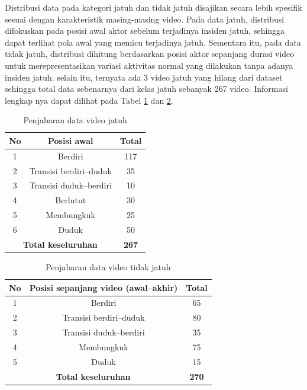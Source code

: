 Distribusi data pada kategori jatuh dan tidak jatuh disajikan secara lebih spesifik sesuai dengan karakteristik masing-masing video. Pada data jatuh, distribusi difokuskan pada posisi awal aktor sebelum terjadinya insiden jatuh, sehingga dapat terlihat pola awal yang memicu terjadinya jatuh. Sementara itu, pada data tidak jatuh, distribusi dihitung berdasarkan posisi aktor sepanjang durasi video untuk merepresentasikan variasi aktivitas normal yang dilakukan tanpa adanya insiden jatuh. selain itu, ternyata ada 3 video jatuh yang hilang dari dataset sehingga total data sebenarnya dari kelas jatuh sebanyak 267 video. Informasi lengkap nya dapat dilihat pada Tabel \ref{table:4.data jatuh} dan \ref{table:4.data tidak jatuh}. \par


\begin{table}[htbp]
    \centering
    \caption{Penjabaran data video jatuh}
    \label{table:4.data jatuh}
    \begin{tabular}{|c|c|c|}
        \hline
        \textbf{No} & \textbf{Posisi awal} & \textbf{Total} \\ \hline
        1 & Berdiri                    & 117 \\ \hline
        2 & Transisi berdiri--duduk   & 35  \\ \hline
        3 & Transisi duduk--berdiri   & 10  \\ \hline
        4 & Berlutut                   & 30  \\ \hline
        5 & Membungkuk                 & 25  \\ \hline
        6 & Duduk                      & 50  \\ \hline
        \multicolumn{2}{|c|}{\textbf{Total keseluruhan}} & \textbf{267} \\ \hline
    \end{tabular}
\end{table}




\begin{table}[htbp]
    \centering
    \caption{Penjabaran data video tidak jatuh}
    \label{table:4.data tidak jatuh}
    \begin{tabular}{|c|c|c|}
        \hline
        \textbf{No} & \textbf{Posisi sepanjang video (awal--akhir)} & \textbf{Total} \\ \hline
        1 & Berdiri                  & 65 \\ \hline
        2 & Transisi berdiri--duduk  & 80 \\ \hline
        3 & Transisi duduk--berdiri  & 35 \\ \hline
        4 & Membungkuk               & 75 \\ \hline
        5 & Duduk                    & 15 \\ \hline
        \multicolumn{2}{|c|}{\textbf{Total keseluruhan}} & \textbf{270} \\ \hline
    \end{tabular}
\end{table}



